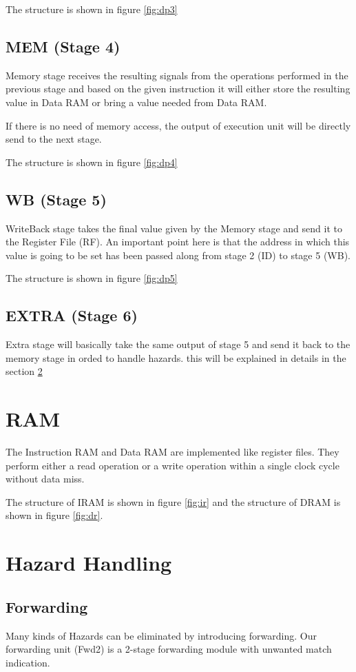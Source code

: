 The structure is shown in figure \ref{fig:dp3}

\subsection[MEM (Stage 4)]{MEM (Stage 4)}
Memory stage receives the resulting signals from the operations performed in the previous stage and based on the given instruction it will either store the resulting value in Data RAM or bring a value needed from Data RAM.

If there is no need of memory access, the output of execution unit will be directly send to the next stage.

The structure is shown in figure \ref{fig:dp4}

\subsection[WB (Stage 5)]{WB (Stage 5)}
WriteBack stage takes the final value given by the Memory stage and send it to the Register File (RF). An important point here is
that the address in which this value is going to be set has been passed along from stage 2 (ID) to stage 5 (WB).

The structure is shown in figure \ref{fig:dp5}

\subsection[EXTRA (Stage 6)]{EXTRA (Stage 6)}
Extra stage will basically take the same output of stage 5 and send it back to the memory stage in orded to handle hazards. this will be explained in details in the section \ref{ch:hazard}


\section[RAM]{RAM}
The Instruction RAM and Data RAM are implemented like register files. They perform
either a read operation or a write operation within a single clock cycle without
data miss.

The structure of IRAM is shown in figure \ref{fig:ir} and the structure of DRAM
is shown in figure \ref{fig:dr}. 

\section[Hazard Handling]{Hazard Handling}
\label{ch:hazard}
\subsection[Forwarding]{Forwarding}
Many kinds of Hazards can be eliminated by introducing forwarding. Our forwarding
unit (Fwd2) is a 2-stage forwarding module with unwanted match indication.

